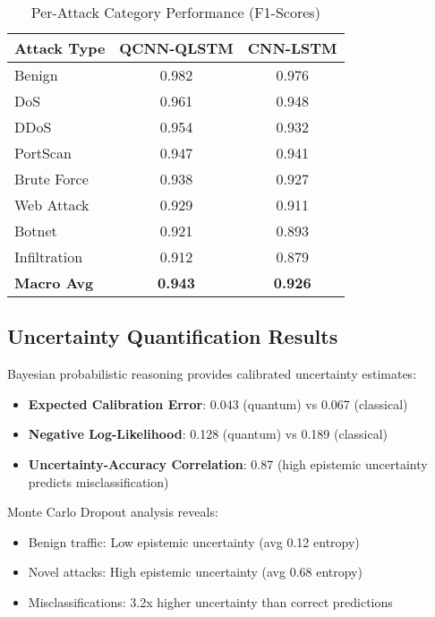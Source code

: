 \documentclass[conference]{IEEEtran}
\begin{document}
\begin{table}[htbp]
\caption{Per-Attack Category Performance (F1-Scores)}
\begin{center}
\begin{tabular}{lcc}
\toprule
\textbf{Attack Type} & \textbf{QCNN-QLSTM} & \textbf{CNN-LSTM} \\
\midrule
Benign & 0.982 & 0.976 \\
DoS & 0.961 & 0.948 \\
DDoS & 0.954 & 0.932 \\
PortScan & 0.947 & 0.941 \\
Brute Force & 0.938 & 0.927 \\
Web Attack & 0.929 & 0.911 \\
Botnet & 0.921 & 0.893 \\
Infiltration & 0.912 & 0.879 \\
\midrule
\textbf{Macro Avg} & \textbf{0.943} & \textbf{0.926} \\
\bottomrule
\end{tabular}
\label{tab:attack_performance}
\end{center}
\end{table}

\subsection{Uncertainty Quantification Results}

Bayesian probabilistic reasoning provides calibrated uncertainty estimates:

\begin{itemize}
    \item \textbf{Expected Calibration Error}: 0.043 (quantum) vs 0.067 (classical)
    \item \textbf{Negative Log-Likelihood}: 0.128 (quantum) vs 0.189 (classical)
    \item \textbf{Uncertainty-Accuracy Correlation}: 0.87 (high epistemic uncertainty predicts misclassification)
\end{itemize}

Monte Carlo Dropout analysis reveals:
\begin{itemize}
    \item Benign traffic: Low epistemic uncertainty (avg 0.12 entropy)
    \item Novel attacks: High epistemic uncertainty (avg 0.68 entropy)
    \item Misclassifications: 3.2x higher uncertainty than correct predictions
\end{itemize}
\end{document}
